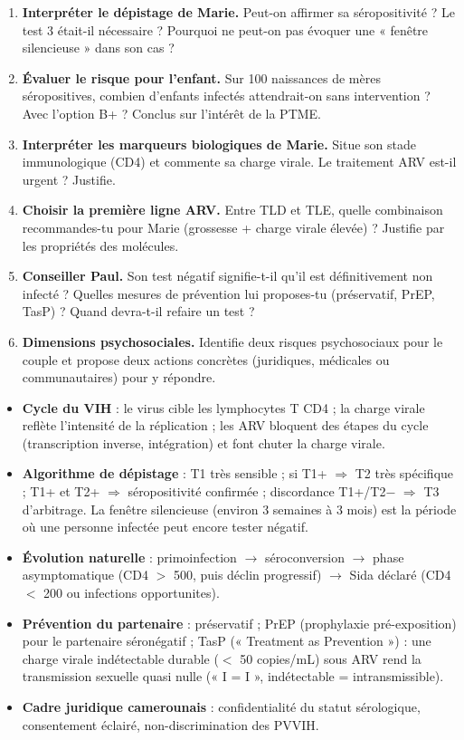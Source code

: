\documentclass[11pt]{article}
\newcommand{\cle}[1]{{\popxbold\color{popdark}#1}}
\newcounter{popsec}
\newcounter{popsub}
\newcommand{\courssub}[1]{%
  \stepcounter{popsub}%
  \par\vspace{9pt}\noindent{\popxbold\fontsize{11.5}{13}\selectfont\color{popink}{\color{poporange}\thepopsec.\thepopsub}\hspace{6pt}#1}\par\nopagebreak\vspace{4pt}
}
\begin{document}
\begin{enumerate}
\item \textbf{Interpréter le dépistage de Marie.} Peut-on affirmer sa séropositivité ? Le test 3 était-il nécessaire ? Pourquoi ne peut-on pas évoquer une « fenêtre silencieuse » dans son cas ?
\item \textbf{Évaluer le risque pour l'enfant.} Sur 100 naissances de mères séropositives, combien d'enfants infectés attendrait-on sans intervention ? Avec l'option B+ ? Conclus sur l'intérêt de la PTME.
\item \textbf{Interpréter les marqueurs biologiques de Marie.} Situe son stade immunologique (CD4) et commente sa charge virale. Le traitement ARV est-il urgent ? Justifie.
\item \textbf{Choisir la première ligne ARV.} Entre TLD et TLE, quelle combinaison recommandes-tu pour Marie (grossesse + charge virale élevée) ? Justifie par les propriétés des molécules.
\item \textbf{Conseiller Paul.} Son test négatif signifie-t-il qu'il est définitivement non infecté ? Quelles mesures de prévention lui proposes-tu (préservatif, PrEP, TasP) ? Quand devra-t-il refaire un test ?
\item \textbf{Dimensions psychosociales.} Identifie deux risques psychosociaux pour le couple et propose deux actions concrètes (juridiques, médicales ou communautaires) pour y répondre.
\end{enumerate}

\courssub{Ressources à mobiliser}

\begin{itemize}
\item \textbf{Cycle du VIH} : le virus cible les lymphocytes T CD4 ; la charge virale reflète l'intensité de la réplication ; les ARV bloquent des étapes du cycle (transcription inverse, intégration) et font chuter la charge virale.
\item \textbf{Algorithme de dépistage} : T1 très sensible ; si T1+ $\Rightarrow$ T2 très spécifique ; T1+ et T2+ $\Rightarrow$ séropositivité confirmée ; discordance T1+/T2$-$ $\Rightarrow$ T3 d'arbitrage. La \cle{fenêtre silencieuse} (environ 3 semaines à 3 mois) est la période où une personne infectée peut encore tester négatif.
\item \textbf{Évolution naturelle} : primoinfection $\rightarrow$ séroconversion $\rightarrow$ phase asymptomatique (CD4 $>$ 500, puis déclin progressif) $\rightarrow$ Sida déclaré (CD4 $<$ 200 ou infections opportunites).
\item \textbf{Prévention du partenaire} : préservatif ; \cle{PrEP} (prophylaxie pré-exposition) pour le partenaire séronégatif ; \cle{TasP} (« Treatment as Prevention ») : une charge virale indétectable durable ($<$ 50 copies/mL) sous ARV rend la transmission sexuelle quasi nulle (« I = I », indétectable = intransmissible).
\item \textbf{Cadre juridique camerounais} : confidentialité du statut sérologique, consentement éclairé, non-discrimination des PVVIH.
\end{itemize}
\end{document}
